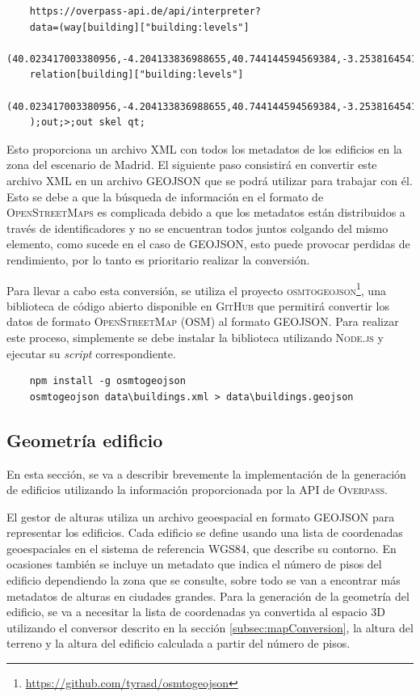 \documentclass[a4paper, 11pt]{book}
\begin{document}
 \label{manual:consultaEdificios}
{\scriptsize
    \begin{verbatim}
    https://overpass-api.de/api/interpreter?
    data=(way[building]["building:levels"]
    (40.023417003380956,-4.204133836988655,40.744144594569384,-3.253816454176155);
    relation[building]["building:levels"]
    (40.023417003380956,-4.204133836988655,40.744144594569384,-3.253816454176155);
    );out;>;out skel qt;
    \end{verbatim}
}
Esto proporciona un archivo \textsc{XML} con todos los metadatos de los edificios en la zona del escenario de Madrid. El siguiente paso consistirá en convertir este archivo \textsc{XML} en un archivo \textsc{GEOJSON} que se podrá utilizar para trabajar con él. Esto se debe a que la búsqueda de información en el formato de \textsc{OpenStreetMaps} es complicada debido a que los metadatos están distribuidos a través de identificadores y no se encuentran todos juntos colgando del mismo elemento, como sucede en el caso de \textsc{GEOJSON}, esto puede provocar perdidas de rendimiento, por lo tanto es prioritario realizar la conversión.

Para llevar a cabo esta conversión, se utiliza el proyecto \textsc{osmtogeojson}\footnote{\url{https://github.com/tyrasd/osmtogeojson}}, una biblioteca de código abierto disponible en \textsc{GitHub} que permitirá convertir los datos de formato \textsc{OpenStreetMap} (\textsc{OSM}) al formato \textsc{GEOJSON}. 
Para realizar este proceso, simplemente se debe instalar la biblioteca utilizando \textsc{Node.js} y ejecutar su \emph{script} correspondiente.

\label{manual:osmtogeojson}
{\scriptsize
    \begin{verbatim}
    npm install -g osmtogeojson
    osmtogeojson data\buildings.xml > data\buildings.geojson
    \end{verbatim}
}

\subsection{Geometría edificio}
\label{subsec:buildingGeometry}
En esta sección, se va a describir brevemente la implementación de la generación de edificios utilizando la información proporcionada por la \textsc{\gls{API}} de \textsc{Overpass}.

El gestor de alturas utiliza un archivo geoespacial en formato \textsc{GEOJSON} para representar los edificios. Cada edificio se define usando una lista de coordenadas geoespaciales en el sistema de referencia \textsc{WGS84}, que describe su contorno. En ocasiones también se incluye un metadato que indica el número de pisos del edificio dependiendo la zona que se consulte, sobre todo se van a encontrar más metadatos de alturas en ciudades grandes. 
Para la generación de la geometría del edificio, se va a necesitar la lista de coordenadas ya convertida al espacio \textsc{3D} utilizando el conversor descrito en la sección \ref{subsec:mapConversion}, la altura del terreno y la altura del edificio calculada a partir del número de pisos.
\end{document}
